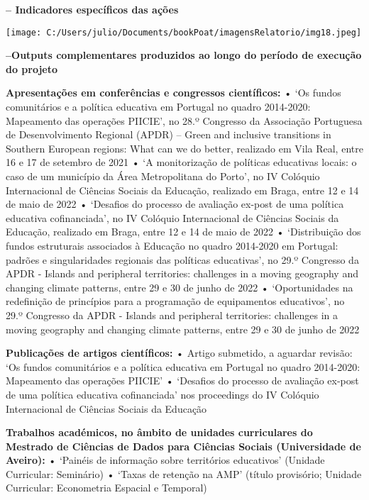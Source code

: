 \documentclass[
]{book}
\begin{document}
\textbf{\textbar\textbar\textbar{} -- Indicadores específicos das ações}

\texttt{[image: C:/Users/julio/Documents/bookPoat/imagensRelatorio/img18.jpeg]}

\textbf{\textbar\textbar\textbar\textbar{} --Outputs complementares produzidos ao longo do período de execução do projeto}

\textbf{Apresentações em conferências e congressos científicos:}
• `Os fundos comunitários e a política educativa em Portugal no quadro 2014-2020: Mapeamento das operações PIICIE', no 28.º Congresso da Associação Portuguesa de Desenvolvimento Regional (APDR) -- Green and inclusive transitions in Southern European regions: What can we do better, realizado em Vila Real, entre 16 e 17 de setembro de 2021
• `A monitorização de políticas educativas locais: o caso de um município da Área Metropolitana do Porto', no IV Colóquio Internacional de Ciências Sociais da Educação, realizado em Braga, entre 12 e 14 de maio de 2022
• `Desafios do processo de avaliação ex-post de uma política educativa cofinanciada', no IV Colóquio Internacional de Ciências Sociais da Educação, realizado em Braga, entre 12 e 14 de maio de 2022
• `Distribuição dos fundos estruturais associados à Educação no quadro 2014-2020 em Portugal: padrões e singularidades regionais das políticas educativas', no 29.º Congresso da APDR - Islands and peripheral territories: challenges in a moving geography and changing climate patterns, entre 29 e 30 de junho de 2022
• `Oportunidades na redefinição de princípios para a programação de equipamentos educativos', no 29.º Congresso da APDR - Islands and peripheral territories: challenges in a moving geography and changing climate patterns, entre 29 e 30 de junho de 2022

\textbf{Publicações de artigos científicos:}
• Artigo submetido, a aguardar revisão: `Os fundos comunitários e a política educativa em Portugal no quadro 2014-2020: Mapeamento das operações PIICIE'
• `Desafios do processo de avaliação ex-post de uma política educativa cofinanciada' nos proceedings do IV Colóquio Internacional de Ciências Sociais da Educação

\textbf{Trabalhos académicos, no âmbito de unidades curriculares do Mestrado de Ciências de Dados para Ciências Sociais (Universidade de Aveiro):}
• `Painéis de informação sobre territórios educativos' (Unidade Curricular: Seminário)
• `Taxas de retenção na AMP' (título provisório; Unidade Curricular: Econometria Espacial e Temporal)

  
\end{document}
